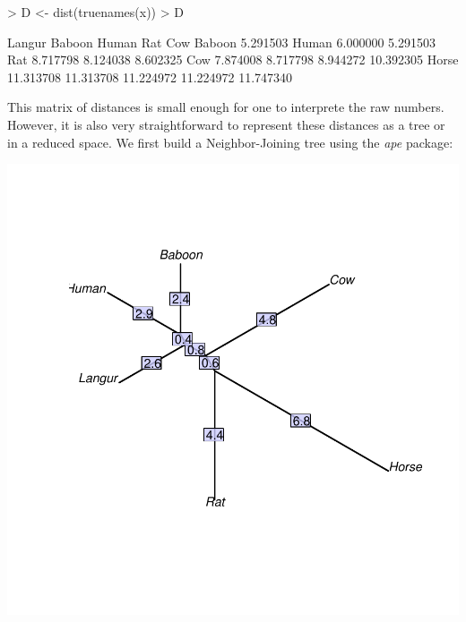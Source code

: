 \documentclass{article}
\begin{document}
\begin{Schunk}
\begin{Sinput}
> D <- dist(truenames(x))
> D
\end{Sinput}
\begin{Soutput}
          Langur    Baboon     Human       Rat       Cow
Baboon  5.291503                                        
Human   6.000000  5.291503                              
Rat     8.717798  8.124038  8.602325                    
Cow     7.874008  8.717798  8.944272 10.392305          
Horse  11.313708 11.313708 11.224972 11.224972 11.747340
\end{Soutput}
\end{Schunk}
This matrix of distances is small enough for one to interprete the raw numbers.
However, it is also very straightforward to represent these distances as a tree or in a reduced space.
We first build a Neighbor-Joining tree using the \emph{ape} package:
\begin{Schunk}
\end{Schunk}
\includegraphics{figs/base-njAA}
\end{document}
